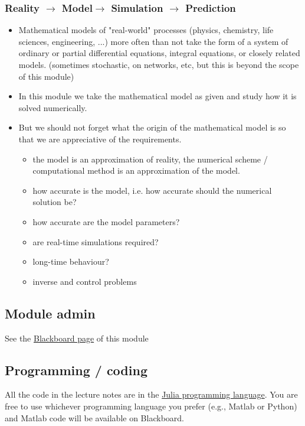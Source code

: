 \documentclass[12pt,a4paper]{article}
\begin{document}
\subsubsection{Reality $\rightarrow$ Model$\rightarrow$ Simulation $\rightarrow$ Prediction}
\begin{itemize}
\item Mathematical models of "real-world" processes (physics, chemistry, life sciences, engineering, ...) more often than not take the form of a system of ordinary or partial differential equations, integral equations, or closely related models. (sometimes stochastic, on networks, etc, but this is beyond the scope of this module) 


\item In this module we take the mathematical model as given and study how it is solved numerically.


\item But we should not forget what the origin of the mathematical model is so that we are appreciative of the requirements. 

\begin{itemize}
\item the model is an approximation of reality, the numerical scheme / computational method is an approximation of the model.


\item how accurate is the model, i.e. how accurate should the numerical solution be? 


\item how accurate are the model parameters? 


\item are real-time simulations required?


\item long-time behaviour? 


\item inverse and control problems

\end{itemize}
\end{itemize}
\subsection{Module admin}
See the \href{https://blackboard.le.ac.uk/}{Blackboard page} of this module

\subsection{Programming / coding}
All the code in the lecture notes are in the \href{https://julialang.org/}{Julia programming language}. You are free to use whichever programming language you prefer (e.g., Matlab or Python) and Matlab code will be available on Blackboard.
\end{document}
